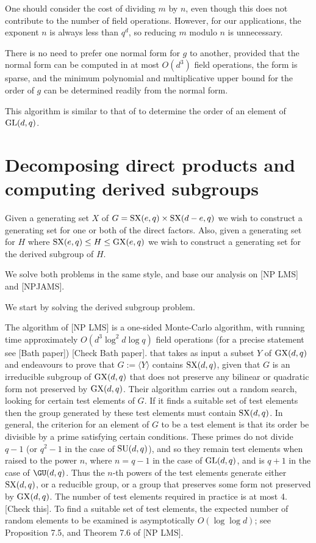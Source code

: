 \documentclass[12pt]{article}
\def\GL{{\rm GL}}
\def\SU{{\rm SU}}
\def\SX{{\rm SX}}
\def\GX{{\rm GX}}
\begin{document}
One should consider the cost of
dividing $m$ by $n$, even though this does not 
contribute to the number of field operations. 
However, for our applications, the exponent $n$ 
is always less than $q^d$, so
reducing $m$ modulo $n$ is unnecessary.

There is no need to prefer one normal form for $g$ to another,
provided that the normal form can be computed in at most $O(d^3)$ field
operations, the form is sparse, and the minimum polynomial
and multiplicative upper bound for the order of $g$
can be determined readily from the normal form.

This algorithm is similar to 
that of \cite{CLG97} to determine 
the order of an element of $\GL(d, q)$.

\section{Decomposing direct products and computing derived subgroups}\label{Pow}
Given a generating set $X$ of $G=\SX(e,q)\times\SX(d-e,q)$ we
wish to construct a generating set for one or both of the direct factors.
Also, given a generating set for $H$ where $\SX(e,q)\le H\le
\GX(e,q)$ we wish to construct a generating set for the derived
subgroup of $H$.

We solve both problems in the same style, and base our analysis on [NP LMS] and
[NPJAMS].

We start by solving the derived subgroup problem.  

The algorithm of [NP LMS] is a one-sided Monte-Carlo
algorithm, with running time approximately $O(d^3\log^2d\log q)$ 
field operations (for a precise statement see [Bath paper])
[Check Bath paper].
that takes
as input a subset $Y$ of $\GX(d,q)$ and endeavours to prove that
$G:=\langle Y\rangle$ contains $\SX(d,q)$, given that
$G$ is an irreducible subgroup of $\GX(d,q)$ that does not
preserve any bilinear or quadratic form not preserved by $\GX(d,q)$.
Their algorithm
carries out a random search, looking for certain test elements of $G$.  If it
finds a suitable set of test elements then the group generated by these test elements
must contain $\SX(d,q)$.  
In general, the criterion for an element of $G$ to be a test
element is that its order be divisible by a prime satisfying certain conditions.
These primes do not divide $q-1$ (or $q^2-1$ in the case of $\SU(d,q)$), and
so they remain test elements when raised to the power $n$, where $n=q-1$
in the case of $\GL(d,q)$, and is $q+1$ in the case of $\GU(d,q)$.
Thus the $n$-th
powers of the test elements  generate either $\SX(d,q)$, or a reducible group,
or a group that preserves some form not preserved by $\GX(d,q)$.  The number
of test elements required in practice is at most 4.  [Check this].
To find a suitable set of test elements, the expected number of
random elements to be examined is asymptotically
$O(\log\log d)$; see Proposition 7.5, and Theorem 7.6 of [NP LMS].
\end{document}
